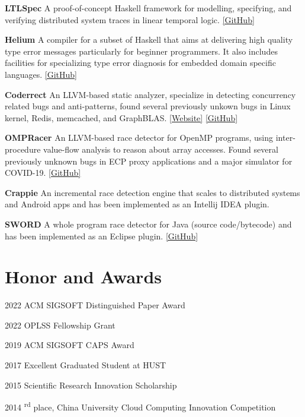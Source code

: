 \documentclass[12pt,letterpaper]{report}
\newcommand{\listtabwidth}{1.75cm}
\begin{document}
\begin{tablist}
	\item[\textbf{LTLSpec}]
	\tab A proof-of-concept Haskell framework for modelling, specifying, and verifying distributed system traces in linear temporal logic.
	\href{https://github.com/ejconlon/ltlspec}{[GitHub]}
	\item[\textbf{Helium}]
	\tab A compiler for a subset of Haskell that aims at delivering high quality type error messages particularly for beginner programmers. It also includes facilities for specializing type error diagnosis for embedded domain specific languages. \href{https://github.com/Helium4Haskell/helium}{[GitHub]}
	\item[\textbf{Coderrect}]
	\tab An LLVM-based static analyzer, specialize in detecting concurrency related bugs and anti-patterns, found several previously unkown bugs in Linux kernel, Redis, memcached, and GraphBLAS. \href{https://coderrect.com/}{[Website]} \href{https://github.com/jtao/OpenRace}{[GitHub]}
	\item[\textbf{OMPRacer}]
	\tab An LLVM-based race detector for OpenMP programs,
	using inter-procedure value-flow analysis to reason about array accesses.
	Found several previously unknown bugs in ECP proxy applications and a major simulator for COVID-19. \href{https://github.com/parasol-aser/OMPRacer}{[GitHub]}
	\item[\textbf{Crappie}]
	\tab An incremental race detection engine that scales to distributed systems and Android apps and has been implemented as an Intellij IDEA plugin.
	\item[\textbf{SWORD}]
	\tab A whole program race detector for Java (source code/bytecode) and has been implemented as an Eclipse plugin. \href{https://github.com/funemy/SWORD}{[GitHub]}
\end{tablist}
\renewcommand{\listtabwidth}{1.75cm}

\vspace{-0.5em}
\section*{Honor and Awards}

\begin{tablist}
	\item[2022] \tab ACM SIGSOFT Distinguished Paper Award
	\item[2022] \tab OPLSS Fellowship Grant
	\item[2019] \tab ACM SIGSOFT CAPS Award
	\item[2017] \tab Excellent Graduated Student at HUST
	\item[2015] \tab Scientific Research Innovation Scholarship
	\item[2014] \textsuperscript{rd} place, China University Cloud Computing Innovation Competition
\end{tablist}
\end{document}
